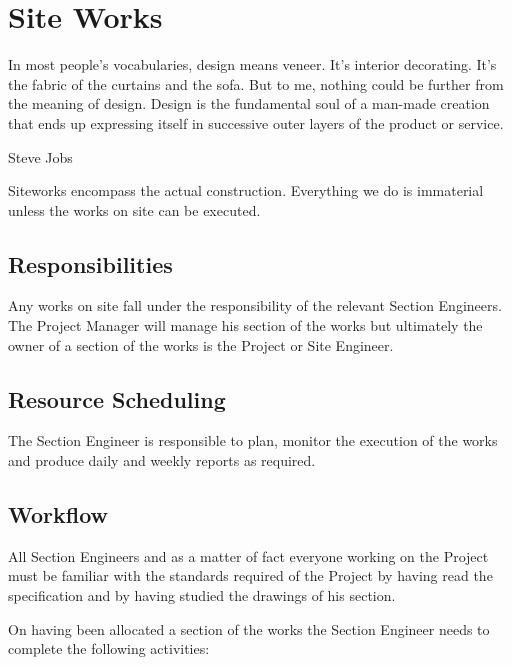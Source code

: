 \chapter{Site Works}

\epigraph{In most people’s vocabularies, design means veneer. It’s interior decorating. It’s the fabric of the curtains and the sofa. But to me, nothing could be further from the meaning of design. Design is the fundamental soul of a man-made creation that ends up expressing itself in successive outer layers of the product or service.}{Steve Jobs}

Siteworks encompass the actual construction. Everything we do is immaterial
unless the works on site can be executed.

\section*{Responsibilities}

Any works on site fall under the responsibility of the relevant Section Engineers.
The Project Manager will manage his section of the works but ultimately
the owner of a section of the works is the Project or Site Engineer.


\section*{Resource Scheduling}

The Section Engineer is responsible to plan, monitor the execution of the works
and produce daily and weekly reports as required.

\section*{Workflow}

All Section Engineers and as a matter of fact everyone working on the Project
must be familiar with the standards required of the Project by having read the
specification and by having studied the drawings of his section.

On having been allocated a section of the works the Section Engineer needs to
complete the following activities:


